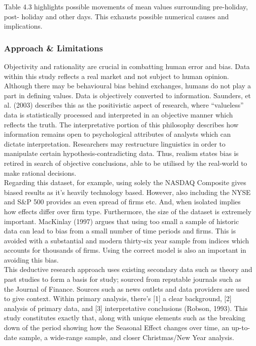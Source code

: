 \documentclass[11pt, english]{article}
\begin{document}
	Table 4.3 highlights possible movements of mean values surrounding pre-holiday, post- holiday and other days. This exhausts possible numerical causes and implications.

		\subsubsection{Approach \& Limitations}

		Objectivity and rationality are crucial in combatting human error and bias. Data within this study reflects a real market and not subject to human opinion. Although there may be behavioural bias behind exchanges, humans do not play a part in defining values. Data is objectively converted to information. Saunders, et al. (2003) describes this as the positivistic aspect of research, where ``valueless'' data is statistically processed and interpreted in an objective manner which reflects the truth. The interpretative portion of this philosophy describes how information remains open to psychological attributes of analysts which can dictate interpretation. Researchers may restructure linguistics in order to manipulate certain hypothesis-contradicting data. Thus, realism states bias is retired in search of objective conclusions, able to be utilised by the real-world to make rational decisions.\\

		Regarding this dataset, for example, using solely the NASDAQ Composite gives biased results as it’s heavily technology based. However, also including the NYSE and S\&P 500 provides an even spread of firms etc. And, when isolated implies how effects differ over firm type. Furthermore, the size of the dataset is extremely important. MacKinlay (1997) argues that using too small a sample of historic data can lead to bias from a small number of time periods and firms. This is avoided with a substantial and modern thirty-six year sample from indices which accounts for thousands of firms. Using the correct model is also an important in avoiding this bias.\\

		This deductive research approach uses existing secondary data such as theory and past studies to form a basis for study; sourced from reputable journals such as the Journal of Finance. Sources such as news outlets and data providers are used to give context. Within primary analysis, there’s [1] a clear background, [2] analysis of primary data, and [3] interpretative conclusions (Robson, 1993). This study constitutes exactly that, along with unique elements such as the breaking down of the period showing how the Seasonal Effect changes over time, an up-to-date sample, a wide-range sample, and closer Christmas/New Year analysis.
\end{document}
